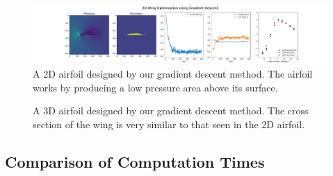 \documentclass{article} %
\begin{document}
\begin{figure}[h]
\begin{center}
\includegraphics[scale=0.25]{../test/figs/learn_gradient_descent.pdf}
\end{center}
\caption{A 2D airfoil designed by our gradient descent method. The airfoil works by producing a low pressure area above its surface.}
\end{figure}


\begin{figure}[h]
\begin{center}
\end{center}
\caption{A 3D airfoil designed by our gradient descent method. The cross section of the wing is very similar to that seen in the 2D airfoil.}
\end{figure}

\subsection{Comparison of Computation Times}
\end{document}
